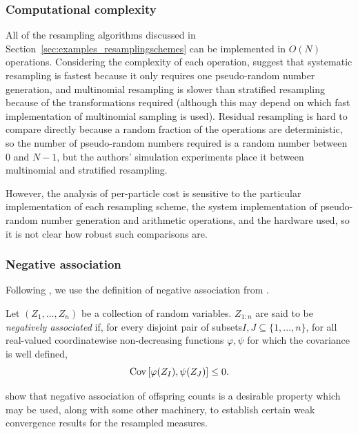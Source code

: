 \subsubsection{Computational complexity}
All of the resampling algorithms discussed in Section~\ref{sec:examples_resamplingschemes} can be implemented in $O(N)$ operations.
Considering the complexity of each operation, \textcite{hol2006} suggest that systematic resampling is fastest because it only requires one pseudo-random number generation, and multinomial resampling is slower than stratified resampling because of the transformations required (although this may depend on which fast implementation of multinomial sampling is used). Residual resampling is hard to compare directly because a random fraction of the operations are deterministic, so the number of pseudo-random numbers required is a random number between $0$ and $N-1$, but the authors' simulation experiments place it between multinomial and stratified resampling.

However, the analysis of per-particle cost is sensitive to the particular implementation of each resampling scheme, the system implementation of pseudo-random number generation and arithmetic operations, and the hardware used, so it is not clear how robust such comparisons are.




\subsubsection{Negative association}
Following \textcite{gerber2017}, we use the definition of negative association from \textcite{joag1983}.
\begin{defn}
Let $(Z_1, \dots, Z_n)$ be a collection of random variables. 
$Z_{1:n}$ are said to be \emph{negatively associated} if, for every disjoint pair of subsets$I, J \subseteq \{1,\dots,n\}$, for all real-valued coordinatewise non-decreasing functions $\varphi, \psi$ for which the covariance is well defined,
\begin{equation*}
\operatorname{Cov} \left[ \varphi( Z_I) , \psi(Z_J) \right] \leq 0 .
\end{equation*}
\end{defn}
\textcite{gerber2017} show that negative association of offspring counts is a desirable property which may be used, along with some other machinery, to establish certain weak convergence results for the resampled measures.

